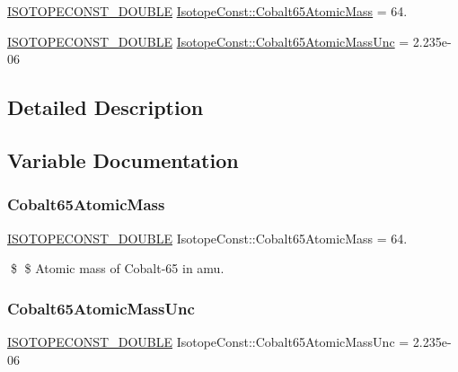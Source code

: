 \begin{DoxyCompactItemize}
\item 
\mbox{\hyperlink{group___isotope_const-_macros_ga8f45a7272ce02c0b4c65c44636ed719a}{I\+S\+O\+T\+O\+P\+E\+C\+O\+N\+S\+T\+\_\+\+D\+O\+U\+B\+LE}} \mbox{\hyperlink{group___isotope_const-_cobalt-_co65_gae940e4a514f199ef42e6984f30f19c84}{Isotope\+Const\+::\+Cobalt65\+Atomic\+Mass}} = 64.
\item 
\mbox{\hyperlink{group___isotope_const-_macros_ga8f45a7272ce02c0b4c65c44636ed719a}{I\+S\+O\+T\+O\+P\+E\+C\+O\+N\+S\+T\+\_\+\+D\+O\+U\+B\+LE}} \mbox{\hyperlink{group___isotope_const-_cobalt-_co65_ga54e6e883647621cf5b81ef1a8f0b172c}{Isotope\+Const\+::\+Cobalt65\+Atomic\+Mass\+Unc}} = 2.\+235e-\/06
\end{DoxyCompactItemize}


\subsection{Detailed Description}


\subsection{Variable Documentation}
\mbox{\label{group___isotope_const-_cobalt-_co65_gae940e4a514f199ef42e6984f30f19c84}} 
\subsubsection{\texorpdfstring{Cobalt65\+Atomic\+Mass}{Cobalt65AtomicMass}}
{\footnotesize\ttfamily \mbox{\hyperlink{group___isotope_const-_macros_ga8f45a7272ce02c0b4c65c44636ed719a}{I\+S\+O\+T\+O\+P\+E\+C\+O\+N\+S\+T\+\_\+\+D\+O\+U\+B\+LE}} Isotope\+Const\+::\+Cobalt65\+Atomic\+Mass = 64.}

\$ \$ Atomic mass of Cobalt-\/65 in amu. \mbox{\label{group___isotope_const-_cobalt-_co65_ga54e6e883647621cf5b81ef1a8f0b172c}} 
\subsubsection{\texorpdfstring{Cobalt65\+Atomic\+Mass\+Unc}{Cobalt65AtomicMassUnc}}
{\footnotesize\ttfamily \mbox{\hyperlink{group___isotope_const-_macros_ga8f45a7272ce02c0b4c65c44636ed719a}{I\+S\+O\+T\+O\+P\+E\+C\+O\+N\+S\+T\+\_\+\+D\+O\+U\+B\+LE}} Isotope\+Const\+::\+Cobalt65\+Atomic\+Mass\+Unc = 2.\+235e-\/06}

